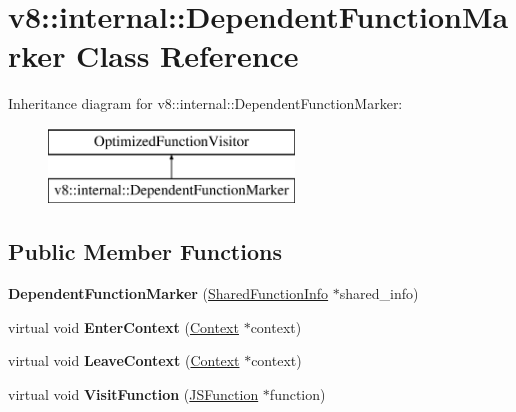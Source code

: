 \hypertarget{classv8_1_1internal_1_1_dependent_function_marker}{}\section{v8\+:\+:internal\+:\+:Dependent\+Function\+Marker Class Reference}
\label{classv8_1_1internal_1_1_dependent_function_marker}
Inheritance diagram for v8\+:\+:internal\+:\+:Dependent\+Function\+Marker\+:\begin{figure}[H]
\begin{center}
\leavevmode
\includegraphics[height=2.000000cm]{classv8_1_1internal_1_1_dependent_function_marker}
\end{center}
\end{figure}
\subsection*{Public Member Functions}
\begin{DoxyCompactItemize}
\item 
\hypertarget{classv8_1_1internal_1_1_dependent_function_marker_ad359f825843bdf536d88a0ceec4d645a}{}{\bfseries Dependent\+Function\+Marker} (\hyperlink{classv8_1_1internal_1_1_shared_function_info}{Shared\+Function\+Info} $\ast$shared\+\_\+info)\label{classv8_1_1internal_1_1_dependent_function_marker_ad359f825843bdf536d88a0ceec4d645a}

\item 
\hypertarget{classv8_1_1internal_1_1_dependent_function_marker_af9e56f6a2bb6003e950f3e9293a72731}{}virtual void {\bfseries Enter\+Context} (\hyperlink{classv8_1_1internal_1_1_context}{Context} $\ast$context)\label{classv8_1_1internal_1_1_dependent_function_marker_af9e56f6a2bb6003e950f3e9293a72731}

\item 
\hypertarget{classv8_1_1internal_1_1_dependent_function_marker_aca050ad932c28e1955c47a27557a6ddf}{}virtual void {\bfseries Leave\+Context} (\hyperlink{classv8_1_1internal_1_1_context}{Context} $\ast$context)\label{classv8_1_1internal_1_1_dependent_function_marker_aca050ad932c28e1955c47a27557a6ddf}

\item 
\hypertarget{classv8_1_1internal_1_1_dependent_function_marker_a51887c50f4dff6af26d014570a8fa90f}{}virtual void {\bfseries Visit\+Function} (\hyperlink{classv8_1_1internal_1_1_j_s_function}{J\+S\+Function} $\ast$function)\label{classv8_1_1internal_1_1_dependent_function_marker_a51887c50f4dff6af26d014570a8fa90f}

\end{DoxyCompactItemize}
